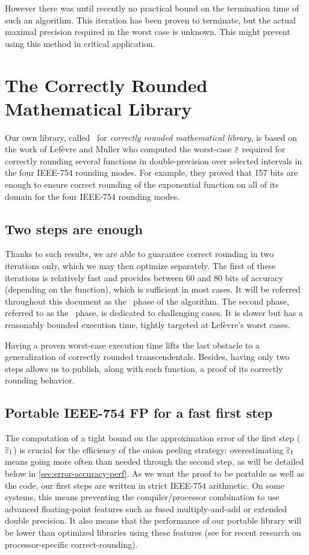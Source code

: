 However there was until recently no practical bound on the termination
time of such an algorithm. This iteration has been proven to
terminate, but the actual maximal precision required in the worst case
is unknown.  This might prevent using this method in critical
application.




\section{The Correctly Rounded Mathematical Library}
\label{section:crlibm}

Our own library, called \crlibm\ for \emph{correctly rounded
  mathematical library}, is based on the work of
Lef\`evre and Muller \cite{LMT98,Lef2000} who computed the worst-case ${\overline{\varepsilon}}$
required for correctly rounding several functions in double-precision
over selected intervals in the four IEEE-754 rounding modes. For
example, they proved that 157 bits are enough to ensure correct rounding
of the exponential function on all of its domain for the four IEEE-754
rounding modes.

\subsection{Two steps are enough}
Thanks to such results, we are able to guarantee correct rounding in
two iterations only, which we may then optimize separately. The first
of these iterations is relatively fast and provides between 60 and 80
bits of accuracy (depending on the function), which is sufficient in
most cases. It will be referred throughout this document as the \quick\ 
phase of the algorithm. The second phase, referred to as the
\accurate\ phase, is dedicated to challenging cases. It is slower but
has a reasonably bounded execution time, tightly targeted at
Lef\`evre's worst cases.

Having a proven worst-case execution time lifts the last obstacle to a
generalization of correctly rounded transcendentals. Besides, having
only two steps allows us to publish, along with each function, a proof
of its correctly rounding behavior.


\subsection{Portable IEEE-754 FP for a fast first step}
The computation of a tight bound on the approximation error of the
first step (${\overline{\varepsilon}}_1$) is crucial for the efficiency of the onion
peeling strategy: overestimating ${\overline{\varepsilon}}_1$ means going more often
than needed through the second step, as will be detailed below in
\ref{sec:error-accuracy-perf}. As we want the proof to be portable as
well as the code, our first steps are written in strict IEEE-754
arithmetic. On some systems, this means preventing the
compiler/processor combination to use advanced floating-point features
such as fused multiply-and-add or extended double precision. It also
means that the performance of our portable library will be lower than
optimized libraries using these features (see \cite{DinGast2005} for
recent research on processor-specific correct-rounding).

